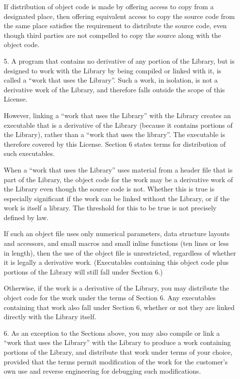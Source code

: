 \begin{multicols}{3}
\begin{itemize}
   If distribution of object code is made by offering access to copy from a
   designated place, then offering equivalent access to copy the source
   code from the same place satisfies the requirement to distribute the
   source code, even though third parties are not compelled to copy the
   source along with the object code.
   
 \item[5.] A program that contains no derivative of any portion of the
   Library, but is designed to work with the Library by being compiled
   or linked with it, is called a ``work that uses the Library''. Such a
   work, in isolation, is not a derivative work of the Library, and
   therefore falls outside the scope of this License.

   However, linking a ``work that uses the Library'' with the Library creates
   an executable that is a derivative of the Library (because it contains
   portions of the Library), rather than a ``work that uses the
   library''. The executable is therefore covered by this License. Section 6
   states terms for distribution of such executables.

   When a ``work that uses the Library'' uses material from a header file
   that is part of the Library, the object code for the work may be a
   derivative work of the Library even though the source code is
   not. Whether this is true is especially significant if the work can be
   linked without the Library, or if the work is itself a library. The
   threshold for this to be true is not precisely defined by law.

   If such an object file uses only numerical parameters, data structure
   layouts and accessors, and small macros and small inline functions (ten
   lines or less in length), then the use of the object file is
   unrestricted, regardless of whether it is legally a derivative
   work. (Executables containing this object code plus portions of the
   Library will still fall under Section 6.)

   Otherwise, if the work is a derivative of the Library, you may
   distribute the object code for the work under the terms of Section
   6. Any executables containing that work also fall under Section 6,
   whether or not they are linked directly with the Library itself.
   
 \item[6.] As an exception to the Sections above, you may also compile
   or link a ``work that uses the Library'' with the Library to produce
   a work containing portions of the Library, and distribute that work
   under terms of your choice, provided that the terms permit
   modification of the work for the customer's own use and reverse
   engineering for debugging such modifications.


\end{itemize}
\end{multicols}
